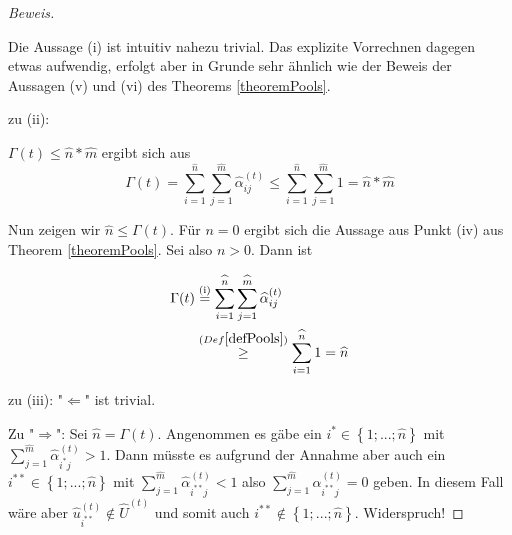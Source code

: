 \begin{proof}[Beweis] \textrm{ }

\vspace{0.3cm}

Die Aussage (i) ist intuitiv nahezu trivial. Das explizite Vorrechnen dagegen etwas aufwendig, erfolgt aber in Grunde sehr ähnlich wie der Beweis der Aussagen (v) und (vi) des Theorems \ref{theoremPools}.

\vspace{0.4cm}

zu (ii): 

$\Gamma(t) \leq \widehat{n} * \widehat{m}$ ergibt sich aus
\begin{equation*}
  \Gamma(t) = \sum_{i=1}^{\widehat{n}} \sum_{j=1}^{\widehat{m}} \widehat{\alpha}^{(t)}_{ij} \leq \sum_{i=1}^{\widehat{n}} \sum_{j=1}^{\widehat{m}} 1 = \widehat{n} * \widehat{m}
\end{equation*}

\vspace{0.3cm}

Nun zeigen wir $\widehat{n} \leq \Gamma(t)$. Für $n = 0$ ergibt sich die Aussage aus Punkt (iv) aus Theorem \ref{theoremPools}. Sei also $n > 0$. Dann ist

\begin{align*}
\Gamma(t) &\overset{\text{(i)}}{=} \sum_{i=1}^{\widehat{n}} \sum_{j=1}^{\widehat{m}} \widehat{\alpha}^{(t)}_{ij} \\
&\overset{(Def \ref{defPools})}{\geq} \sum_{i=1}^{\widehat{n}} 1 = \widehat{n}
\end{align*}

\vspace{0.4cm}

zu (iii): 
"$\Leftarrow$" ist trivial. 

\vspace{0.4cm}

Zu "$\Rightarrow$": Sei $\widehat{n} = \Gamma(t)$. Angenommen es gäbe ein $i^{*} \in \left\{1;...; \widehat{n} \right\}$ mit $\sum_{j=1}^{\widehat{m}} \widehat{\alpha}^{(t)}_{i^{*}j} > 1$. Dann müsste es aufgrund der Annahme aber auch ein $i^{**} \in \left\{1;...; \widehat{n} \right\}$ mit $\sum_{j=1}^{\widehat{m}} \widehat{\alpha}^{(t)}_{i^{**}j} < 1$ also $\sum_{j=1}^{\widehat{m}} \widehat{\alpha}^{(t)}_{i^{**}j} = 0$ geben. In diesem Fall wäre aber $\widehat{u}^{(t)}_{i^{**}} \notin \widehat{U}^{(t)}$ und somit auch $i^{**} \notin \left\{1;...; \widehat{n} \right\}$. Widerspruch!

\vspace{0.4cm}


\end{proof}
